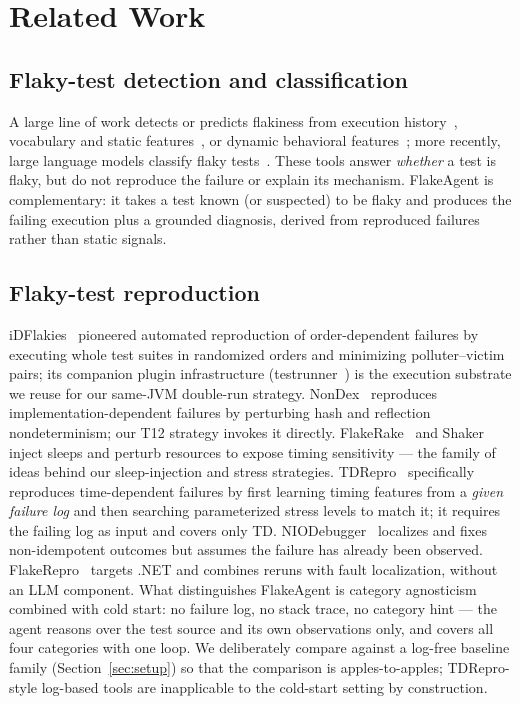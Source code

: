 \section{Related Work}

\subsection{Flaky-test detection and classification}

A large line of work detects or predicts flakiness from execution
history~\cite{pinto2020understanding,alshammari2021flakeflagger,
lam2020idflakies}, vocabulary and static features~\cite{pinto2020understanding,
haben2023flakiness}, or dynamic behavioral features~\cite{fatima2022flakify};
more recently, large language models classify flaky
tests~\cite{kim2024large,yang2024predicting,fatima2023flakycat}. These tools
answer \emph{whether} a test is flaky, but do not reproduce the failure or
explain its mechanism. FlakeAgent is complementary: it takes a test known (or
suspected) to be flaky and produces the failing execution plus a grounded
diagnosis, derived from reproduced failures rather than static signals.

\subsection{Flaky-test reproduction}

iDFlakies~\cite{lam2019idflakies} pioneered automated reproduction of
order-dependent failures by executing whole test suites in randomized orders
and minimizing polluter--victim pairs; its companion plugin infrastructure
(testrunner~\cite{oei2020testrunner}) is the execution substrate we reuse for
our same-JVM double-run strategy. NonDex~\cite{gyori2016nondex} reproduces
implementation-dependent failures by perturbing hash and reflection
nondeterminism; our T12 strategy invokes it directly. FlakeRake~\cite{
bell2017flakerake} and Shaker~\cite{silva2017practical} inject sleeps and
perturb resources to expose timing sensitivity — the family of ideas behind
our sleep-injection and stress strategies. TDRepro~\cite{chen2024tdrepro}
specifically reproduces time-dependent failures by first learning timing
features from a \emph{given failure log} and then searching parameterized
stress levels to match it; it requires the failing log as input and covers
only TD. NIODebugger~\cite{shen2024nidebugger} localizes and fixes
non-idempotent outcomes but assumes the failure has already been observed.
FlakeRepro~\cite{alghmadi2023flakerepro} targets .NET and combines reruns
with fault localization, without an LLM component. What distinguishes
FlakeAgent is category agnosticism combined with cold start: no failure log,
no stack trace, no category hint — the agent reasons over the test source
and its own observations only, and covers all four categories with one loop.
We deliberately compare against a log-free baseline family (Section~\ref{sec:setup})
so that the comparison is apples-to-apples; TDRepro-style log-based tools are
inapplicable to the cold-start setting by construction.

